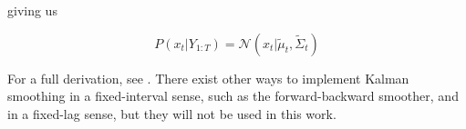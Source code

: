 giving us

\begin{equation}
P(x_t|Y_{1:T}) = \mathcal{N}(x_t|\tilde{\mu}_t, \tilde{\Sigma}_{t})
\label{eq:}
\end{equation}

For a full derivation, see \cite{Rauch1965}. There exist other ways to implement Kalman smoothing in a fixed-interval sense, such as the forward-backward smoother, and in a fixed-lag sense, but they will not be used in this work.